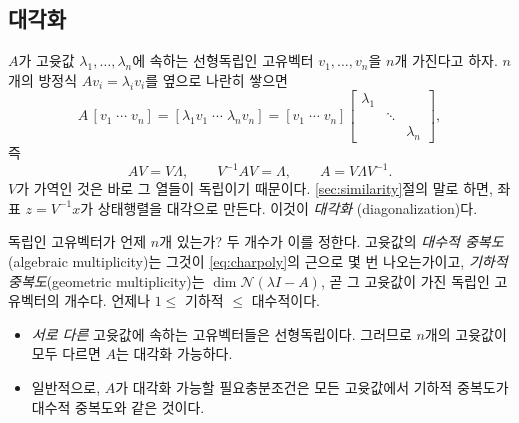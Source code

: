 \documentclass[11pt]{article}
\begin{document}
\subsection{대각화}\label{sec:diag}
$A$가 고윳값 $\lambda_1,\dots,\lambda_n$에 속하는 선형독립인 고유벡터
$v_1,\dots,v_n$을 $n$개 가진다고 하자. $n$개의 방정식 $Av_i=\lambda_iv_i$를 옆으로
나란히 쌓으면
\[
   A\,[v_1\;\cdots\;v_n] = [\lambda_1v_1\;\cdots\;\lambda_nv_n]
   = [v_1\;\cdots\;v_n]
     \begin{bmatrix}\lambda_1&&\\&\ddots&\\&&\lambda_n\end{bmatrix},
\]
즉
\begin{equation}\label{eq:diagonalize}
   AV = V\Lambda,\qquad V^{-1}AV=\Lambda,\qquad A = V\Lambda V^{-1}.
\end{equation}
$V$가 가역인 것은 바로 그 열들이 독립이기 때문이다. \ref{sec:similarity}절의 말로
하면, 좌표 $z=V^{-1}x$가 상태행렬을 대각으로 만든다. 이것이 \emph{대각화}
(diagonalization)다.

독립인 고유벡터가 언제 $n$개 있는가? 두 개수가 이를 정한다. 고윳값의 \emph{대수적
중복도}(algebraic multiplicity)는 그것이 \eqref{eq:charpoly}의 근으로 몇 번
나오는가이고, \emph{기하적 중복도}(geometric multiplicity)는
$\dim\mathcal N(\lambda I-A)$, 곧 그 고윳값이 가진 독립인 고유벡터의 개수다.
언제나 $1\le$ 기하적 $\le$ 대수적이다.
\begin{itemize}[leftmargin=*,itemsep=2pt]
\item \emph{서로 다른} 고윳값에 속하는 고유벡터들은 선형독립이다. 그러므로 $n$개의
고윳값이 모두 다르면 $A$는 대각화 가능하다.
\item 일반적으로, $A$가 대각화 가능할 필요충분조건은 모든 고윳값에서 기하적 중복도가
대수적 중복도와 같은 것이다.
\end{itemize}
\end{document}
